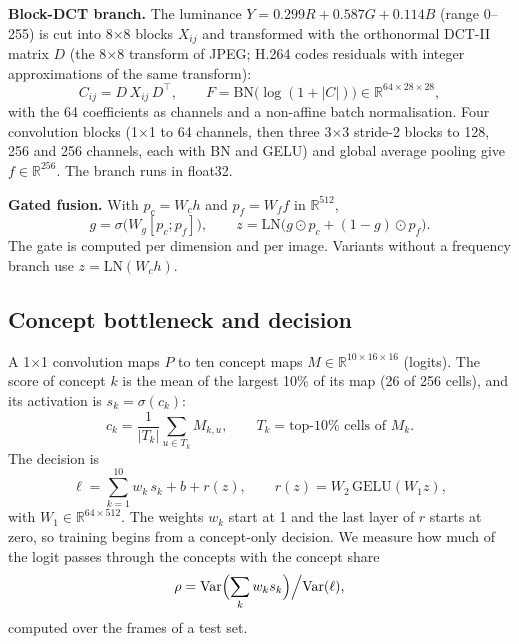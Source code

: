 \documentclass[conference]{IEEEtran}
\begin{document}
\textbf{Block-DCT branch.} The luminance $Y = 0.299R+0.587G+0.114B$ (range 0--255) is cut into 8$\times$8 blocks
$X_{ij}$ and transformed with the orthonormal DCT-II matrix $D$ (the 8$\times$8 transform of JPEG; H.264 codes
residuals with integer approximations of the same transform):
\begin{equation}
C_{ij} = D\,X_{ij}\,D^{\top}, \qquad F = \mathrm{BN}\bigl(\log(1+|C|)\bigr)\in\mathbb{R}^{64\times28\times28},
\end{equation}
with the 64 coefficients as channels and a non-affine batch normalisation. Four convolution blocks (1$\times$1 to
64 channels, then three 3$\times$3 stride-2 blocks to 128, 256 and 256 channels, each with BN and GELU) and global
average pooling give $f\in\mathbb{R}^{256}$. The branch runs in float32.

\textbf{Gated fusion.} With $p_c = W_c h$ and $p_f = W_f f$ in $\mathbb{R}^{512}$,
\begin{equation}
g = \sigma\bigl(W_g[p_c;p_f]\bigr), \qquad z = \mathrm{LN}\bigl(g\odot p_c + (1-g)\odot p_f\bigr).
\end{equation}
The gate is computed per dimension and per image. Variants without a frequency branch use $z=\mathrm{LN}(W_c h)$.

\subsection{Concept bottleneck and decision}
A 1$\times$1 convolution maps $P$ to ten concept maps $M\in\mathbb{R}^{10\times16\times16}$ (logits). The score of
concept $k$ is the mean of the largest 10\% of its map (26 of 256 cells), and its activation is
$s_k=\sigma(c_k)$:
\begin{equation}
c_k = \frac{1}{|T_k|}\sum_{u\in T_k} M_{k,u},\qquad T_k = \text{top-}10\%\text{ cells of }M_k .
\end{equation}
The decision is
\begin{equation}
\ell = \sum_{k=1}^{10} w_k\, s_k + b + r(z), \qquad r(z) = W_2\,\mathrm{GELU}(W_1 z),
\label{eq:decision}
\end{equation}
with $W_1\in\mathbb{R}^{64\times512}$. The weights $w_k$ start at 1 and the last layer of $r$ starts at zero, so
training begins from a concept-only decision. We measure how much of the logit passes through the concepts with the
concept share
\begin{equation}
\rho = \mathrm{Var}\Bigl(\sum_k w_k s_k\Bigr)\Big/\mathrm{Var}(\ell),
\end{equation}
computed over the frames of a test set.
\end{document}
